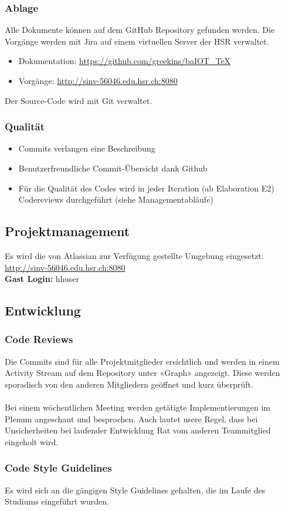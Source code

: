 		\subsubsection*{Ablage}
			Alle Dokumente können auf dem GitHub Repository gefunden werden. Die Vorgänge werden mit Jira auf einem virtuellen Server der HSR verwaltet.
			\begin{itemize}
				\item Dokumentation: \url{https://github.com/greekins/baIOT_TeX} 
				\item Vorgänge: \url{http://sinv-56046.edu.hsr.ch:8080}
			\end{itemize}
			Der Source-Code wird mit Git verwaltet.

		\subsubsection*{Qualität}
			\begin{itemize}
				\item Commits verlangen eine Beschreibung
				\item Benutzerfreundliche Commit-Übersicht dank Github
				\item Für die Qualität des Codes wird in jeder Iteration (ab Elaboration E2) Codereviews durchgeführt (siehe Managementabläufe)
			\end{itemize}

	\subsection*{Projektmanagement}
		Es wird die von Atlassian zur Verfügung gestellte Umgebung eingesetzt: \\
		\url{http://sinv-56046.edu.hsr.ch:8080} \\
		\textbf{Gast Login:} hhuser


	\subsection*{Entwicklung}
		\subsubsection*{Code Reviews}
			Die Commits sind für alle Projektmitglieder ersichtlich und werden in einem Activity Stream auf dem Repository unter 
			«Graph» angezeigt. Diese werden sporadisch von den anderen Mitgliedern geöffnet und kurz überprüft. \\
			\\
			Bei einem wöchentlichen Meeting werden getätigte Implementierungen im Plenum angeschaut und besprochen. Auch lautet usere 
			Regel, dass bei Unsicherheiten bei laufender Entwicklung Rat vom anderen Teammitglied eingeholt wird.

		\subsubsection*{Code Style Guidelines}
			Es wird sich an die gängigen Style Guidelines gehalten, die im Laufe des Studiums eingeführt wurden.